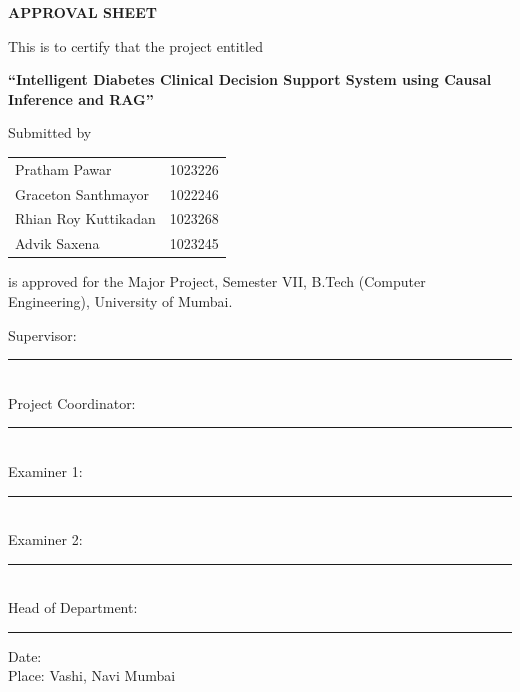\begin{center}{\LARGE\bf APPROVAL SHEET}\end{center}
\vspace{0.5cm}
\noindent This is to certify that the project entitled
\begin{center}\Large\textbf{``Intelligent Diabetes Clinical Decision Support System using Causal Inference and RAG''}\end{center}
\noindent Submitted by
\begin{center}
\begin{tabular}{ll}
Pratham Pawar & 1023226\\
Graceton Santhmayor & 1022246\\
Rhian Roy Kuttikadan & 1023268\\
Advik Saxena & 1023245\\
\end{tabular}\end{center}
\noindent is approved for the Major Project, Semester VII, B.Tech (Computer Engineering), University of Mumbai.
\vspace{1.2cm}
\begin{flushright}
Supervisor: \rule{5cm}{0.4pt}\\[0.9cm]
Project Coordinator: \rule{5cm}{0.4pt}\\[0.9cm]
Examiner 1: \rule{5cm}{0.4pt}\\[0.9cm]
Examiner 2: \rule{5cm}{0.4pt}\\[0.9cm]
Head of Department: \rule{5cm}{0.4pt}
\end{flushright}
\vspace{0.8cm}
\noindent Date: \\[4pt] Place: Vashi, Navi Mumbai
